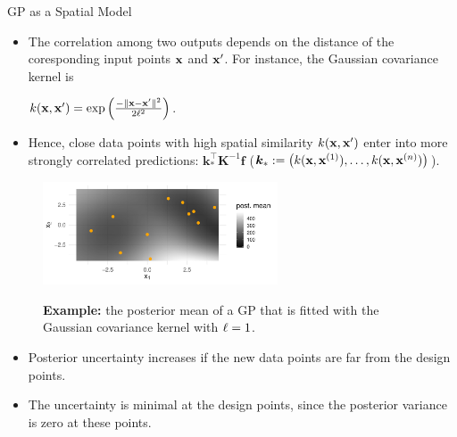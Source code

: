 \begin{frame}[c,allowframebreaks]{GP as a Spatial Model}

\begin{itemize}
\item The correlation among two outputs depends on the distance of the coresponding input points $\mathbf{x}$ and $\mathbf{x}^\prime$. For instance, the Gaussian covariance kernel is \begin{footnotesize}$k(\mathbf{x}, \mathbf{x}^\prime) = \exp \left(\frac{- \|\mathbf{x} - \mathbf{x}^\prime\|^2}{2 \ell^2}\right)$.\end{footnotesize}
\vspace{3mm}
\item Hence, close data points with high spatial similarity $k(\mathbf{x}, \mathbf{x}^\prime)$ enter into more strongly correlated predictions: $\bm{k}_*^\top \bm{K}^{-1} \bm{f}$ ($\bm{k}_* := \left(k(\mathbf{x}, \mathbf{x}^{(1)}),\dots, k(\mathbf{x}, \mathbf{x}^{(n)})\right)$).
\end{itemize}

\begin{figure}\includegraphics[width=0.62\textwidth]{figure/mbo-2d-1.pdf}\par\vspace{-3mm}\begin{footnotesize}\textbf{Example:} the posterior mean of a GP that is fitted with the Gaussian covariance kernel with $\ell = 1$.\end{footnotesize}\end{figure}

\framebreak

\begin{itemize}

\item Posterior uncertainty increases if the new data points are far from the design points.
\lz
\item The uncertainty is minimal at the design points, since the posterior variance is zero at these points.
\end{itemize}


\end{frame}
